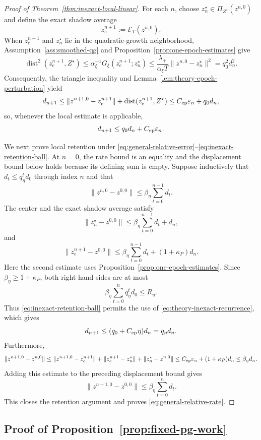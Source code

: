 \documentclass[letterpaper]{article} %
\theoremstyle{definition}
\theoremstyle{remark}
\begin{document}
\begin{proof}[Proof of Theorem~\ref{thm:inexact-local-linear}]
For each $n$, choose
$z_n^\star\in\Pi_{Z^\star}(z^{n,0})$ and define the exact shadow average
\[
    z_e^{n+1}
    :=
    \mathcal E_T(z^{n,0}).
\]
When $z_e^{n+1}$ and $z_n^\star$ lie in the quadratic-growth neighborhood,
Assumption~\ref{ass:smoothed-qg} and
Proposition~\ref{prop:one-epoch-estimates} give
\[
    \operatorname{dist}^2(z_e^{n+1},Z^\star) \le \alpha_\xi^{-1}G_\xi(z_e^{n+1};z_n^\star) \le \frac{\lambda_+}{\alpha_\xi T} \|z^{n,0}-z_n^\star\|^2 = q_0^2d_n^2.
\]
Consequently, the triangle inequality and
Lemma~\ref{lem:theory-epoch-perturbation} yield
\[
    d_{n+1} \le \|z^{n+1,0}-z_e^{n+1}\| + \operatorname{dist}(z_e^{n+1},Z^\star) \le C_{\rm ep}\varepsilon_n+q_0d_n,
\]
so, whenever the local estimate is applicable,
\begin{equation}
\label{eq:theory-inexact-recurrence}
    d_{n+1}
    \le
    q_0d_n+C_{\rm ep}\varepsilon_n.
\end{equation}

We next prove local retention under
\eqref{eq:general-relative-error}--\eqref{eq:inexact-retention-ball}.  At
$n=0$, the rate bound is an equality and the displacement bound below holds
because its defining sum is empty.  Suppose inductively that
$d_t\le q_\eta^td_0$ through index $n$ and that
\[
    \|z^{n,0}-z^{0,0}\|
    \le
    \beta_\eta\sum_{t=0}^{n-1}d_t.
\]
The center and the exact shadow average satisfy
\[
    \|z_n^\star-z^{0,0}\|
    \le
    \beta_\eta\sum_{t=0}^{n-1}d_t+d_n,
\]
and
\[
    \|z_e^{n+1}-z^{0,0}\|
    \le
    \beta_\eta\sum_{t=0}^{n-1}d_t
    +(1+\kappa_P)d_n.
\]
Here the second estimate uses
Proposition~\ref{prop:one-epoch-estimates}.  Since
$\beta_\eta\ge1+\kappa_P$, both right-hand sides are at most
\[
    \beta_\eta\sum_{t=0}^{n}q_\eta^td_0
    \le
    R_\eta.
\]
Thus \eqref{eq:inexact-retention-ball} permits the use of
\eqref{eq:theory-inexact-recurrence}, which gives
\[
    d_{n+1}
    \le
    (q_0+C_{\rm ep}\eta)d_n
    =
    q_\eta d_n.
\]
Furthermore,
\[
    \|z^{n+1,0}-z^{n,0}\| \le \|z^{n+1,0}-z_e^{n+1}\| + \|z_e^{n+1}-z_n^\star\| + \|z_n^\star-z^{n,0}\| \le C_{\rm ep}\varepsilon_n+(1+\kappa_P)d_n \le \beta_\eta d_n.
\]
Adding this estimate to the preceding displacement bound gives
\[
    \|z^{n+1,0}-z^{0,0}\|
    \le
    \beta_\eta\sum_{t=0}^{n}d_t.
\]
This closes the retention argument and proves
\eqref{eq:general-relative-rate}.
\end{proof}

\subsection{Proof of Proposition~\ref{prop:fixed-pg-work}}
\label{app:proof-fixed-pg-work}
\end{document}
